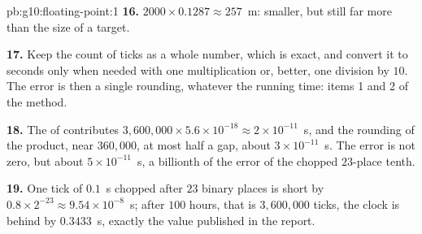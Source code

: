 \begin{solution}{pb:g10:floating-point:1}
\textbf{16.} $2000 \times 0.1287 \approx 257$~m: smaller, but still far more than the size of a target.

\textbf{17.} Keep the count of ticks as a whole number, which is exact, and convert it to seconds only when needed with
one multiplication or, better, one division by $10$. The error is then a single rounding, whatever the running time:
items 1 and 2 of the method.

\textbf{18.} The  of  contributes $3{,}600{,}000 \times 5.6 \times 10^{-18} \approx 2 \times
10^{-11}$~s, and the rounding of the product, near $360{,}000$, at most half a gap, about $3 \times 10^{-11}$~s. The error
is not zero, but about $5 \times 10^{-11}$~s, a billionth of the error of the chopped $23$-place tenth.

\textbf{19.} One tick of $0.1$~s chopped after $23$ binary places is short by $0.8 \times 2^{-23} \approx 9.54 \times
10^{-8}$~s; after $100$ hours, that is $3{,}600{,}000$ ticks, the clock is behind by $0.3433$~s, exactly the value
published in the report.
\end{solution}
